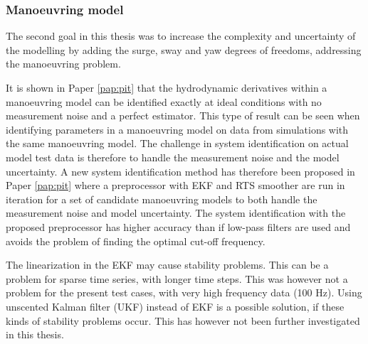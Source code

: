 \subsubsection*{Manoeuvring model}
The second goal in this thesis was to increase the complexity and uncertainty of the modelling by adding the surge, sway and yaw degrees of freedoms, addressing the manoeuvring problem.

It is shown in Paper \ref{pap:pit} that the hydrodynamic derivatives within a manoeuvring model can be identified exactly at ideal conditions with no measurement noise and a perfect estimator. 
This type of result can be seen when identifying parameters in a manoeuvring model on data from simulations with the same manoeuvring model.
The challenge in system identification on actual model test data is therefore to handle the measurement noise and the model uncertainty. A new system identification method has therefore been proposed in Paper \ref{pap:pit} where a preprocessor with EKF and RTS smoother are run in iteration for a set of candidate manoeuvring models to both handle the measurement noise and model uncertainty.
The system identification with the proposed preprocessor has higher accuracy than if low-pass filters are used and avoids the problem of finding the optimal cut-off frequency.

The linearization in the EKF may cause stability problems. This can be a problem for sparse time series, with longer time steps. This was however not a problem for the present test cases, with very high frequency data (100 Hz). 
Using unscented Kalman filter (UKF) instead of EKF is a possible solution, if these kinds of stability problems occur. This has however not been further investigated in this thesis.

